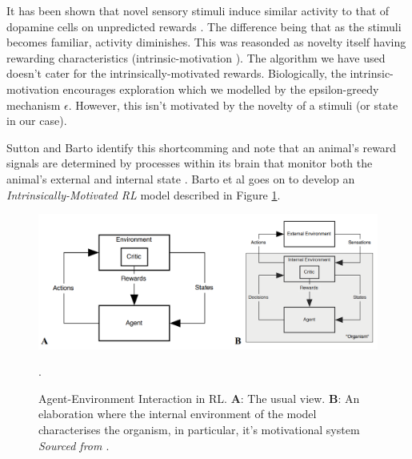 \documentclass[10pt, a4paper]{article}
\begin{document}
It has been shown that novel sensory stimuli induce similar activity to that of dopamine cells on unpredicted rewards \cite{kakade2002dopamine}. The difference being that as the stimuli becomes familiar, activity diminishes. This was reasonded as novelty itself having rewarding characteristics \cite{reed1996intrinsic} (intrinsic-motivation \cite{dayan2002reward}). The algorithm we have used doesn't cater for the intrinsically-motivated rewards. Biologically, the intrinsic-motivation encourages exploration which we modelled by the epsilon-greedy mechanism $\epsilon$. However, this isn't motivated by the novelty of a stimuli (or state in our case).

Sutton and Barto identify this shortcomming and note that an animal's reward signals are determined by processes within its brain that monitor both the animal's external and internal state \cite{sutton1998introduction}. Barto et al goes on to develop an \textit{Intrinsically-Motivated RL} model \cite{chentanez2005intrinsically} described in Figure \ref{fig:Internal-External}.

\begin{figure}[H]
	\includegraphics[width=\textwidth]{Q4-Internal-External-Environment.png}
	\caption{Agent-Environment Interaction in RL. \textbf{A}: The usual view. \textbf{B}: An elaboration where the internal environment of the model characterises the organism, in particular, it's motivational system \textit{Sourced from \cite{chentanez2005intrinsically}}.}.
	\label{fig:Internal-External}

\end{figure}

\newpage

\printbibliography
\end{document}
